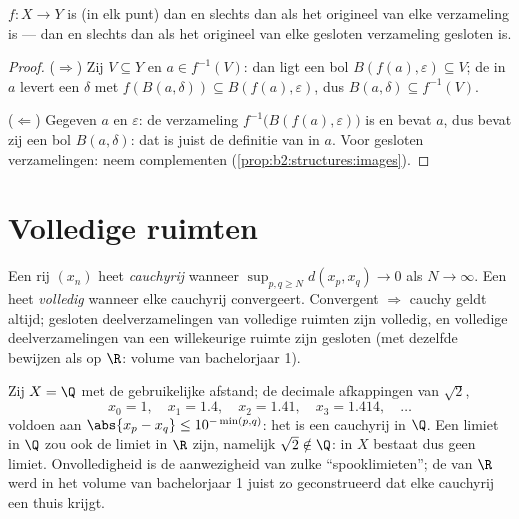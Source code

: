 \begin{theorem}\label{thm:b2:metric:globalcontinuity}
$f \colon X \to Y$ is  (in elk punt) dan en slechts dan als
het origineel van elke  verzameling  is --- dan en slechts
dan als het origineel van elke gesloten verzameling gesloten is.
\end{theorem}

\begin{proof}
($\Rightarrow$) Zij $V \subseteq Y$  en $a \in f^{-1}(V)$: dan
ligt een bol $B(f(a), \varepsilon) \subseteq V$; de  in
$a$ levert een $\delta$ met $f(B(a, \delta)) \subseteq B(f(a),
\varepsilon)$, dus $B(a, \delta) \subseteq f^{-1}(V)$.

($\Leftarrow$) Gegeven $a$ en $\varepsilon$: de verzameling
$f^{-1}\bigl(B(f(a), \varepsilon)\bigr)$ is  en bevat $a$, dus
bevat zij een bol $B(a, \delta)$: dat is juist de definitie van
 in $a$. Voor gesloten verzamelingen: neem complementen
(\cref{prop:b2:structures:images}).
\end{proof}

\section{Volledige ruimten}

\begin{definition}\label{def:b2:metric:complete}
Een rij $(x_n)$ heet \emph{cauchyrij} wanneer $\sup_{p, q \geq N}
d(x_p, x_q) \to 0$ als $N \to \infty$. Een  heet
\emph{volledig} wanneer elke
cauchyrij convergeert. Convergent $\Rightarrow$ cauchy geldt
altijd; gesloten deelverzamelingen van volledige ruimten zijn
volledig, en volledige deelverzamelingen van een willekeurige
ruimte zijn gesloten (met dezelfde bewijzen als op $\R$: volume van
bachelorjaar 1).
\end{definition}

\begin{example}\label{ex:b2:metric:cauchynolimit}
Zij $X = \Q$ met de gebruikelijke afstand; de decimale
afkappingen van $\sqrt2$,
\[
x_0 = 1,\quad x_1 = 1.4,\quad x_2 = 1.41,\quad x_3 = 1.414,
\quad\dots
\]
voldoen aan $\abs{x_p - x_q} \leq 10^{-\min(p,q)}$: het is een
cauchyrij in $\Q$. Een limiet in $\Q$ zou ook de limiet in $\R$
zijn, namelijk $\sqrt2 \notin \Q$: in $X$ bestaat dus geen limiet.
Onvolledigheid is de aanwezigheid van zulke ``spooklimieten''; de
 van $\R$ werd in het volume van bachelorjaar 1 juist
zo geconstrueerd dat elke cauchyrij een thuis krijgt.
\end{example}


